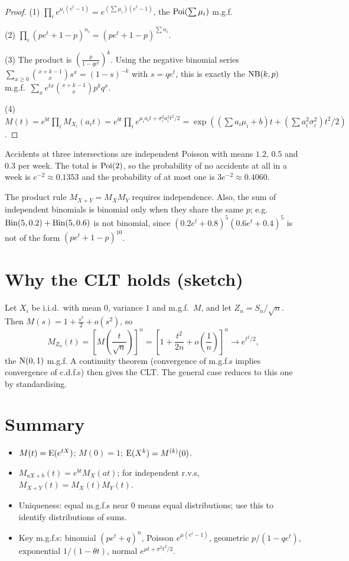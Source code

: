 \begin{proof}
(1) $\prod_i e^{\mu_i(e^t-1)} = e^{(\sum\mu_i)(e^t-1)}$, the $\operatorname{Poi}(\sum \mu_i)$ m.g.f.

(2) $\prod_i(pe^t+1-p)^{n_i} = (pe^t+1-p)^{\sum n_i}$.

(3) The product is $\left(\frac{p}{1-qe^t}\right)^k$. Using the negative binomial series
$\sum_{x\ge0}\binom{x+k-1}{x}s^x = (1-s)^{-k}$ with $s = qe^t$, this is exactly the
$\operatorname{NB}(k,p)$ m.g.f.\ $\sum_x e^{tx}\binom{x+k-1}{x}p^kq^x$.

(4) $M(t) = e^{bt}\prod_i M_{X_i}(a_it) = e^{bt}\prod_i e^{\mu_ia_it + \sigma_i^2a_i^2t^2/2}
= \exp\left((\textstyle\sum a_i\mu_i + b)t + (\sum a_i^2\sigma_i^2)t^2/2\right)$.
\end{proof}

\begin{example}
Accidents at three intersections are independent Poisson with means $1.2$, $0.5$ and
$0.3$ per week. The total is $\operatorname{Poi}(2)$, so the probability of no accidents at all in a
week is $e^{-2}\approx 0.1353$ and the probability of at most one is $3e^{-2}\approx
0.4060$.
\end{example}

\begin{important}[Pitfall]
The product rule $M_{X+Y} = M_XM_Y$ requires independence. Also, the sum of independent
binomials is binomial only when they share the same $p$; e.g.\ $\operatorname{Bin}(5, 0.2) +
\operatorname{Bin}(5, 0.6)$ is not binomial, since $(0.2e^t+0.8)^5(0.6e^t+0.4)^5$ is not of the form
$(pe^t + 1-p)^{10}$.
\end{important}

\section{Why the CLT holds (sketch)}

Let $X_i$ be i.i.d.\ with mean $0$, variance $1$ and m.g.f.\ $M$, and let
$Z_n = S_n/\sqrt n$. Then $M(s) = 1 + \frac{s^2}{2} + o(s^2)$, so
\[
  M_{Z_n}(t) = \left[M\left(\frac{t}{\sqrt n}\right)\right]^n =
  \left[1 + \frac{t^2}{2n} + o\left(\frac1n\right)\right]^n \to e^{t^2/2},
\]
the $\operatorname{N}(0,1)$ m.g.f. A continuity theorem (convergence of m.g.f.s implies convergence
of c.d.f.s) then gives the CLT. The general case reduces to this one by standardising.

\section{Summary}

\begin{itemize}
  \item $M(t) = \operatorname{E}(e^{tX})$; $M(0)=1$; $\operatorname{E}(X^k) = M^{(k)}(0)$.
  \item $M_{aX+b}(t) = e^{bt}M_X(at)$; for independent r.v.s,
        $M_{X+Y}(t) = M_X(t)M_Y(t)$.
  \item Uniqueness: equal m.g.f.s near $0$ means equal distributions; use this to identify
        distributions of sums.
  \item Key m.g.f.s: binomial $(pe^t+q)^n$, Poisson $e^{\mu(e^t-1)}$, geometric
        $p/(1-qe^t)$, exponential $1/(1-\theta t)$, normal $e^{\mu t + \sigma^2t^2/2}$.
\end{itemize}
